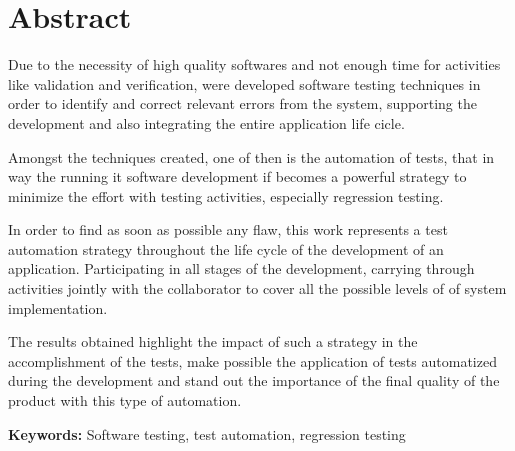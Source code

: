 \chapter*{Abstract}

Due to the necessity of high quality softwares and not enough time for activities like validation and verification, were developed software testing techniques in order to identify and correct relevant errors from the system, supporting the development and also integrating the entire application life cicle.

Amongst the techniques created, one of then is the automation of tests, that in way the running it software development if becomes a powerful strategy to minimize the effort with testing activities, especially regression testing.

In order to find as soon as possible any flaw, this work represents a test automation strategy throughout the life cycle of the development of an application. Participating in all stages of the development, carrying through activities jointly with the collaborator to cover all the possible levels of of system implementation. 

The results obtained highlight the impact of such a strategy in the accomplishment of the tests, make possible the application of tests automatized during the development and stand out the importance of the final quality of the product with this type of automation.


\textbf{Keywords:} Software testing, test automation, regression testing
